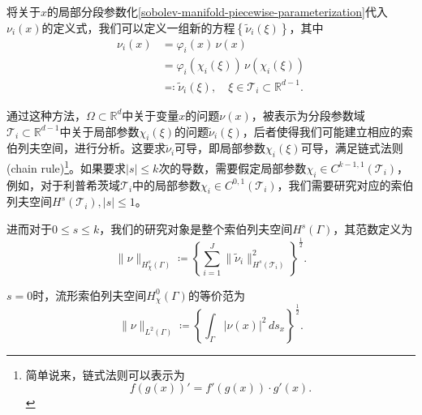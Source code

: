 将关于$x$的局部分段参数化\eqref{sobolev-manifold-piecewise-parameterization}代入$\nu_i(x)$的定义式，我们可以定义一组新的方程$\left\{ \widetilde{\nu}_i(\xi) \right\}$，其中
\begin{equation*}
  \begin{split}
    \nu_i(x) &= \varphi_i(x) \, \nu(x) \\
    &= \varphi_i \left( \chi_i(\xi) \right) \, \nu \left( \chi_i(\xi) \right)  \\
    & \eqqcolon \widetilde{\nu}_i(\xi), \quad \xi \in \mathcal{T}_i \subset \mathbb{R}^{d-1}.
  \end{split}
\end{equation*}

通过这种方法，$\Omega \subset \mathbb{R}^{d}$中关于变量$x$的问题$\nu(x)$，被表示为分段参数域$\mathcal{T}_i \subset \mathbb{R}^{d-1}$中关于局部参数$\chi_i(\xi)$的问题$\widetilde{\nu}_i(\xi)$，后者使得我们可能建立相应的索伯列夫空间，进行分析。这要求$\tilde{\nu}_i$可导，即局部参数$\chi_i(\xi)$可导，满足链式法则(chain rule)\footnote{简单说来，链式法则可以表示为
\begin{equation*}
  f(g(x))' = f'(g(x)) \cdot g'(x).
\end{equation*}}。如果要求$\left| s \right| \le k$次的导数，需要假定局部参数$\chi_i \in C^{k-1,1}(\mathcal{T}_i)$，例如，对于利普希茨域$\mathcal{T}_i$中的局部参数$\chi_i \in C^{0,1}(\mathcal{T}_i)$，我们需要研究对应的索伯列夫空间$H^s(\mathcal{T}_i), \left| s \right| \le 1$。

\begin{definition}[流形索伯列夫空间($0 \le s \le k $)]
进而对于$0 \le s \le k$，我们的研究对象是整个索伯列夫空间$H^s(\Gamma)$，其范数定义为
\begin{equation}
  \label{eq:sobolev-manifold-space-def}
  \big\| \nu \big\|_{H_{\chi}^{s}(\Gamma)} \coloneqq \left\{
  \sum_{i=1}^{J} \big\| \widetilde{\nu}_i \big\|_{H^{s}(\mathcal{T}_{i})}^{2}
  \right\}^{\frac{1}{2}}.
\end{equation}
\end{definition}

\begin{lemma}[流形索伯列夫空间的等价范($s=0$)]
$s=0$时，流形索伯列夫空间$H_{\chi}^{0}(\Gamma)$的等价范为
\begin{equation*}
  \| \nu \|_{L^{2}(\Gamma)} \coloneqq \left\{
  \int_{\Gamma} \big| \nu(x) \big|^2 \, d s_x
  \right\} ^{\frac{1}{2}}.
\end{equation*}
\end{lemma}

